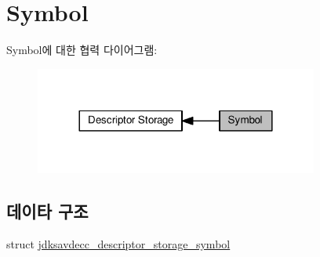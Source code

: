 \hypertarget{group__descriptor__storage__symbol}{}\section{Symbol}
\label{group__descriptor__storage__symbol}
Symbol에 대한 협력 다이어그램\+:
\nopagebreak
\begin{figure}[H]
\begin{center}
\leavevmode
\includegraphics[width=264pt]{group__descriptor__storage__symbol}
\end{center}
\end{figure}
\subsection*{데이타 구조}
\begin{DoxyCompactItemize}
\item 
struct \hyperlink{structjdksavdecc__descriptor__storage__symbol}{jdksavdecc\+\_\+descriptor\+\_\+storage\+\_\+symbol}
\end{DoxyCompactItemize}
